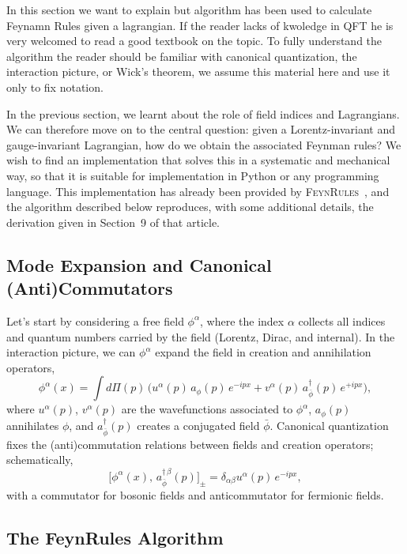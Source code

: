 In this section we want to explain but algorithm has been used to calculate Feynamn Rules given a lagrangian. If the reader lacks of kwoledge in QFT he is very welcomed to read a good textbook on the topic. To fully understand the algorithm the reader should be familiar with canonical quantization, the interaction picture, or Wick's theorem, we
assume this material here and use it only to fix notation.

In the previous section, we learnt about the role of field indices and Lagrangians. We can therefore move on to the central question: given a Lorentz-invariant and gauge-invariant Lagrangian, how do we obtain the associated Feynman rules? We wish to find an implementation that solves this in a systematic and mechanical way, so that it is suitable for implementation in Python or any programming language.
This implementation has already been provided by \textsc{FeynRules}~\cite{Christensen:2008py}, and the algorithm
described below reproduces, with some additional details, the
derivation given in Section~9 of that article.


\subsection{Mode Expansion and Canonical (Anti)Commutators}

Let's start by considering a free field $\phi^\alpha$, where the index $\alpha$ collects
all indices and quantum numbers carried by the field (Lorentz, Dirac,
and internal). In the interaction picture, we can $\phi^\alpha$ expand
the field in creation and annihilation operators,
\begin{equation}
    \phi^\alpha(x) = \int \! d\Pi(p) \,
    \Big( u^\alpha(p)\, a_\phi(p)\, e^{-ipx}
        + v^\alpha(p)\, a_{\bar\phi}^\dagger(p)\, e^{+ipx} \Big),
\end{equation}
where $u^\alpha(p)$, $v^\alpha(p)$ are the wavefunctions associated to
$\phi^\alpha$, $a_\phi(p)$ annihilates $\phi$, and
$a_{\bar\phi}^\dagger(p)$ creates a conjugated field
$\bar\phi$. Canonical quantization fixes the (anti)commutation
relations between fields and creation operators; schematically,
\begin{equation}\label{comm_rule}
    \big[\phi^\alpha(x),\, a_{\bar\phi}^{\dagger\,\beta}(p)\big]_{\pm}
    = \delta_{\alpha\beta} u^\alpha(p)\, e^{-ipx},
\end{equation}
with a commutator for bosonic fields and  anticommutator for
fermionic fields.


\subsection{The FeynRules Algorithm}

